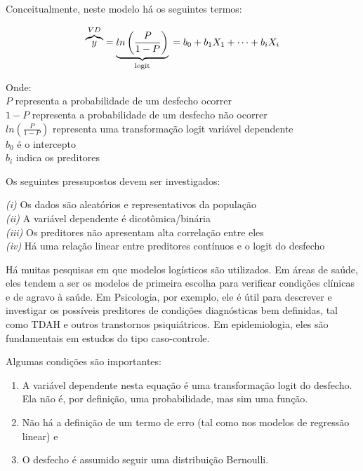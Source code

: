 \documentclass[
]{book}
\providecommand{\tightlist}{%
  \setlength{\itemsep}{0pt}\setlength{\parskip}{0pt}}
\begin{document}
Conceitualmente, neste modelo há os seguintes termos:

\[\overbrace{y}^{VD} = \underbrace{ln\left ( \frac{P}{1-P} \right)}_\text{logit} \\= b_0+b_1X_1+ \dots + b_iX_i\]

Onde:\\
\(P\) representa a probabilidade de um desfecho ocorrer\\
\(1-P\) representa a probabilidade de um desfecho não ocorrer\\
\(ln\left ( \frac{P}{1-P} \right)\) representa uma transformação logit variável dependente\\
\(b_0\) é o intercepto\\
\(b_i\) indica os preditores

Os seguintes pressupostos devem ser investigados:

\emph{(i)} Os dados são aleatórios e representativos da população\\
\emph{(ii)} A variável dependente é dicotômica/binária\\
\emph{(iii)} Os preditores não apresentam alta correlação entre eles\\
\emph{(iv)} Há uma relação linear entre preditores contínuos e o logit do desfecho

Há muitas pesquisas em que modelos logísticos são utilizados. Em áreas de saúde, eles tendem a ser os modelos de primeira escolha para verificar condições clínicas e de agravo à saúde. Em Psicologia, por exemplo, ele é útil para descrever e investigar os possíveis preditores de condições diagnósticas bem definidas, tal como TDAH e outros transtornos psiquiátricos. Em epidemiologia, eles são fundamentais em estudos do tipo caso-controle.

Algumas condições são importantes:

\begin{enumerate}
\def\labelenumi{(\arabic{enumi})}
\tightlist
\item
  A variável dependente nesta equação é uma transformação logit do desfecho. Ela não é, por definição, uma probabilidade, mas sim uma função.\\
\item
  Não há a definição de um termo de erro (tal como nos modelos de regressão linear) e\\
\item
  O desfecho é assumido seguir uma distribuição Bernoulli.
\end{enumerate}
\end{document}

